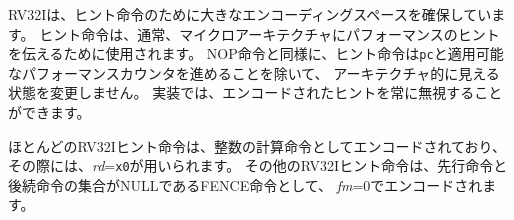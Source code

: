 RV32Iは、ヒント命令のために大きなエンコーディングスペースを確保しています。
ヒント命令は、通常、マイクロアーキテクチャにパフォーマンスのヒントを伝えるために使用されます。
NOP命令と同様に、ヒント命令は{\tt pc}と適用可能なパフォーマンスカウンタを進めることを除いて、
アーキテクチャ的に見える状態を変更しません。
実装では、エンコードされたヒントを常に無視することができます。

\begin{comment}
Most RV32I HINTs are encoded as integer computational instructions with
{\em rd}={\tt x0}.
The other RV32I HINTs are encoded as FENCE instructions with a null
predecessor or successor set and with {\em fm}=0.
\end{comment}

ほとんどのRV32Iヒント命令は、整数の計算命令としてエンコードされており、
その際には、{\em rd}={\tt x0}が用いられます。
その他のRV32Iヒント命令は、先行命令と後続命令の集合がNULLであるFENCE命令として、
{\em fm}=0でエンコードされます。


